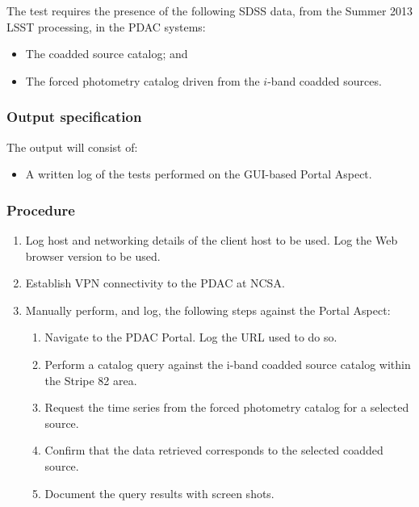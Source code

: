 The test requires the presence of the following SDSS data, from the Summer 2013 LSST processing, in the PDAC systems:

\begin{itemize}

  \item{The coadded source catalog; and}
  \item{The forced photometry catalog driven from the $i$-band coadded sources.}

\end{itemize}


\subsubsection{Output specification}

The output will consist of:

\begin{itemize}
  \item{A written log of the tests performed on the GUI-based Portal Aspect.}
\end{itemize}


\subsubsection{Procedure}

\begin{enumerate}

  \item{Log host and networking details of the client host to be used.
 Log the Web browser version to be used.}
  \item{Establish VPN connectivity to the PDAC at NCSA.}
  \item{Manually perform, and log, the following steps against the Portal Aspect:
    \begin{enumerate}
      \item{Navigate to the PDAC Portal.  Log the URL used to do so.}
      \item{Perform a catalog query against the i-band coadded source catalog within the Stripe 82 area.}
      \item{Request the time series from the forced photometry catalog for a selected source.}
      \item{Confirm that the data retrieved corresponds to the selected coadded source.}
      \item{Document the query results with screen shots.}
    \end{enumerate}
  }

\end{enumerate}
